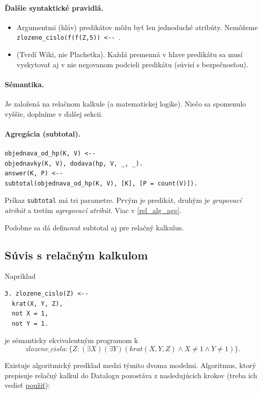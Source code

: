 \documentclass[10pt,a4paper]{article}
\begin{document}
\paragraph{Ďalšie syntaktické pravidlá.}

\begin{itemize}
\item Argumentmi (hláv) predikátov môžu byť len jednoduché atribúty. Nemôžeme \verb|zlozene_cislo(f(f(Z,5)) <-- |.
\item (Tvrdí Wiki, nie Plachetka). Každá premenná v hlave predikátu sa musí vyskytovať aj v nie negovanom podcieli predikátu (súvisí s bezpečnosťou).
\end{itemize}

\paragraph{Sémantika.}
Je založená na relačnom kalkule (a matematickej logike).
Niečo sa spomenulo vyššie, doplníme v ďalšej sekcii.

\paragraph{Agregácia (subtotal).}
\begin{verbatim}
objednava_od_hp(K, V) <--
objednavky(K, V), dodava(hp, V, _, _).
answer(K, P) <--
subtotal(objednava_od_hp(K, V), [K], [P = count(V)]).
\end{verbatim}

Príkaz \verb|subtotal| má tri parametre. Prvým je predikát, druhým je \emph{grupovací atribút} a tretím \emph{agregovací atribút}. Viac v \ref{rel_alg_agg}.

Podobne sa dá definovať subtotal aj pre relačný kalkulus.

\subsection{Súvis s relačným kalkulom}

Napríklad
\begin{verbatim}
3. zlozene_cislo(Z) <--
  krat(X, Y, Z),
  not X = 1,
  not Y = 1.
\end{verbatim}
je sémanticky ekvivalentným programom k $$
zlozene\_cisla: \{Z : (\exists X) (\exists Y) (krat(X,Y,Z) \wedge X \neq 1 \wedge Y \neq 1)\}.
$$


Existuje algoritmický predklad medzi týmito dvoma modelmi.
Algoritmus, ktorý prepisuje relačný kalkul do Datalogu pozostáva z nasledujúcich krokov (treba ich vedieť \underline{použiť}):
\end{document}
